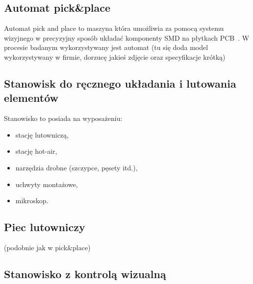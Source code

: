 \subsection{Automat pick\&place}
Automat pick and place to maszyna która umożliwia za pomocą systemu wizyjnego w precyzyjny sposób układać komponenty SMD na płytkach PCB~\cite{automatp&p}. W procesie badanym wykorzystywany jest automat (tu się doda model wykorzystywany w firmie, dorzucę jakieś zdjęcie oraz specyfikacje krótką)


\subsection{Stanowisk do ręcznego układania i lutowania elementów}
Stanowisko to posiada na wyposażeniu:
\begin{itemize}
	\item stację lutowniczą,
	\item stację hot-air,
	\item narzędzia drobne (szczypce, pęsety itd.),
	\item uchwyty montażowe,
	\item mikroskop.
\end{itemize}

\subsection{Piec lutowniczy}
(podobnie jak w pick\&place)
\subsection{Stanowisko z kontrolą wizualną}
